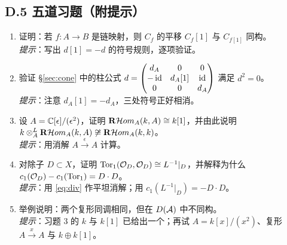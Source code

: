 \subsection*{D.5 五道习题（附提示）}

\begin{enumerate}[leftmargin=1.8em,itemsep=4pt]
\item 证明：若 $f\colon A\to B$ 是链映射，则 $C_f$ 的平移
  $C_f[1]$ 与 $C_{f[1]}$ 同构。\\
  \emph{提示}：写出 $d[1]=-d$ 的符号规则，逐项验证。
\item 验证 §\ref{sec:cone} 中的柱公式
  $d=\begin{pmatrix}d_A&0&0\\-\operatorname{id}&d_A[1]&\operatorname{id}\\0&0&d_A\end{pmatrix}$
  满足 $d^2=0$。\\
  \emph{提示}：注意 $d_A[1]=-d_A$，三处符号正好相消。
\item 设 $A=\mathbb{C}[\epsilon]/(\epsilon^2)$，证明
  $\mathbf{R}\mathcal Hom_A(k,A)\cong k[1]$，并由此说明
  $k\otimes^L_A\mathbf{R}\mathcal Hom_A(k,A)\not\cong\mathbf{R}\mathcal Hom_A(k,k)$。\\
  \emph{提示}：用消解 $A\xrightarrow{\epsilon}A$ 计算。
\item 对除子 $D\subset X$，证明
  $\operatorname{Tor}_1(\mathcal{O}_D,\mathcal{O}_D)\cong L^{-1}|_D$，并解释为什么
  $c_1(\mathcal{O}_D)-c_1(\operatorname{Tor}_1)=D\cdot D$。\\
  \emph{提示}：用 \eqref{eq:div} 作平坦消解；用 $c_1(L^{-1}|_D)=-D\cdot D$。
\item 举例说明：两个复形同调相同，但在 $D(\mathcal{A})$ 中不同构。\\
  \emph{提示}：习题 3 的 $k$ 与 $k[1]$ 已给出一个；再试
  $A=k[x]/(x^2)$、复形 $A\xrightarrow{x}A$ 与 $k\oplus k[1]$。
\end{enumerate}
